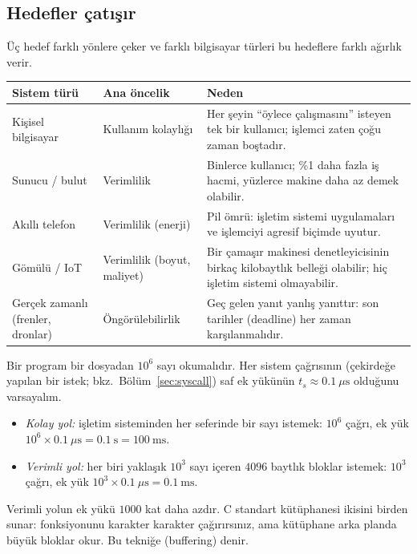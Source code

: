 \subsection{Hedefler çatışır}

Üç hedef farklı yönlere çeker ve farklı bilgisayar türleri bu hedeflere farklı ağırlık verir.

\begin{center}
\renewcommand{\arraystretch}{1.3}
\begin{tabularx}{\linewidth}{>{\raggedright\arraybackslash}p{3.3cm} >{\raggedright\arraybackslash}p{3.2cm} >{\raggedright\arraybackslash}X}
\toprule
\textbf{Sistem türü} & \textbf{Ana öncelik} & \textbf{Neden} \\
\midrule
Kişisel bilgisayar & Kullanım kolaylığı & Her şeyin ``öylece çalışmasını'' isteyen tek bir kullanıcı; işlemci zaten çoğu zaman boştadır. \\
Sunucu / bulut & Verimlilik & Binlerce kullanıcı; \%1 daha fazla iş hacmi, yüzlerce makine daha az demek olabilir. \\
Akıllı telefon & Verimlilik (enerji) & Pil ömrü: işletim sistemi uygulamaları ve işlemciyi agresif biçimde uyutur. \\
Gömülü / IoT & Verimlilik (boyut, maliyet) & Bir çamaşır makinesi denetleyicisinin birkaç kilobaytlık belleği olabilir; hiç işletim sistemi olmayabilir. \\
Gerçek zamanlı (frenler, dronlar) & Öngörülebilirlik & Geç gelen yanıt yanlış yanıttır: son tarihler (deadline) her zaman karşılanmalıdır. \\
\bottomrule
\end{tabularx}
\end{center}

\begin{example}
Bir program bir dosyadan $10^{6}$ sayı okumalıdır. Her sistem çağrısının (çekirdeğe yapılan bir istek; bkz.\ Bölüm~\ref{sec:syscall}) saf ek yükünün $t_{s} \approx 0.1\ \mu\text{s}$ olduğunu varsayalım.
\begin{itemize}
  \item \emph{Kolay yol:} işletim sisteminden her seferinde bir sayı istemek: $10^{6}$ çağrı, ek yük $10^{6} \times 0.1\ \mu\text{s} = 0.1\ \text{s} = 100\ \text{ms}$.
  \item \emph{Verimli yol:} her biri yaklaşık $10^{3}$ sayı içeren $4096$ baytlık bloklar istemek: $10^{3}$ çağrı, ek yük $10^{3} \times 0.1\ \mu\text{s} = 0.1\ \text{ms}$.
\end{itemize}
Verimli yolun ek yükü $1000$ kat daha azdır. C standart kütüphanesi ikisini birden sunar:  fonksiyonunu karakter karakter çağırırsınız, ama kütüphane arka planda büyük bloklar okur. Bu tekniğe  (buffering) denir.
\end{example}

